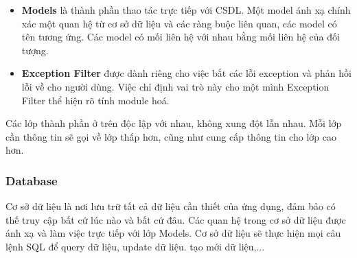 \begin{itemize}
    \item \textbf{Models} là thành phần thao tác trực tiếp với CSDL. Một model ánh xạ chính xác một quan hệ từ cơ sở dữ liệu và các ràng buộc liên quan, các model có tên tương ứng. Các model có mối liên hệ với nhau bằng mối liên hệ của đối tượng.
    
    \item \textbf{Exception Filter} được dành riêng cho việc bắt các lỗi exception và phản hồi lỗi về cho người dùng. Việc chỉ định vai trò này cho một mình Exception Filter thể hiện rõ tính module hoá.

\end{itemize}
Các lớp thành phần ở trên độc lập với nhau, không xung đột lẫn nhau. Mỗi lớp cần thông tin sẽ gọi về lớp thấp hơn, cũng như cung cấp thông tin cho lớp cao hơn.

\subsubsection{Database}
Cơ sở dữ liệu là nơi lưu trữ tất cả dữ liệu cần thiết của ứng dụng, đảm bảo có thế truy cập bất cứ lúc nào và bất cứ đâu. Các quan hệ trong cơ sở dữ liệu được ánh xạ và làm việc trực tiếp với lớp Models. Cơ sở dữ liệu sẽ thực hiện mọi câu lệnh SQL để query dữ liệu, update dữ liệu. tạo mới dữ liệu,...